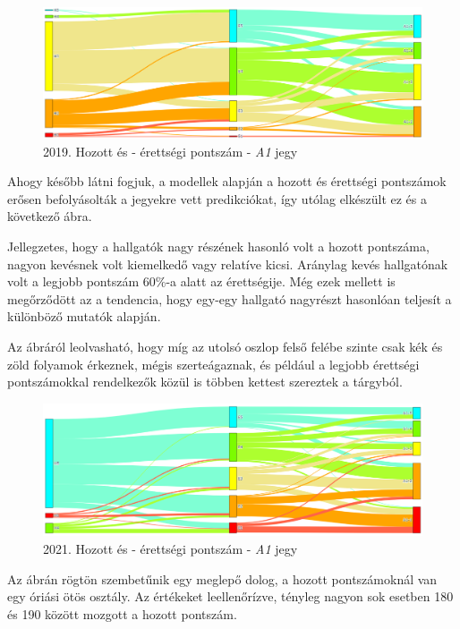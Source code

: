 \documentclass[12pt]{article}
\begin{document}
\begin{figure}[H]
\centering
\includegraphics[scale=0.6]{kepek/2019_hozott_erett_A1.png}
\caption{2019. Hozott és - érettségi pontszám - \textit{A1} jegy}
\label{fig:2019_hozott_erett_A1}
\end{figure}
Ahogy később látni fogjuk, a modellek alapján a hozott és érettségi pontszámok erősen befolyásolták a jegyekre vett predikciókat, így utólag elkészült ez és a következő ábra.

Jellegzetes, hogy a hallgatók nagy részének hasonló volt a hozott pontszáma, nagyon kevésnek volt kiemelkedő vagy relatíve kicsi. Aránylag kevés hallgatónak volt a legjobb pontszám 60\%-a alatt az érettségije. Még ezek mellett is megőrződött az a tendencia, hogy egy-egy hallgató nagyrészt hasonlóan teljesít a különböző mutatók alapján.

Az ábráról leolvasható, hogy míg az utolsó oszlop felső felébe szinte csak kék és zöld folyamok érkeznek, mégis szerteágaznak, és például a legjobb érettségi pontszámokkal rendelkezők közül is többen kettest szereztek a tárgyból. 

\begin{figure}[H]
\centering
\includegraphics[scale=0.6]{kepek/2021_hozott_erett_A1.png}
\caption{2021. Hozott és - érettségi pontszám - \textit{A1} jegy}
\label{fig:2021_hozott_erett_A1}
\end{figure}

Az ábrán rögtön szembetűnik egy meglepő dolog, a hozott pontszámoknál van egy óriási ötös osztály. Az értékeket leellenőrízve, tényleg nagyon sok esetben 180 és 190 között mozgott a hozott pontszám.
\end{document}
